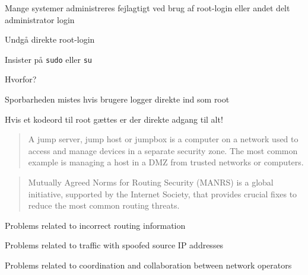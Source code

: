 \documentclass[Screen16to9,17pt]{foils}
\begin{document}
\begin{list1}
\item Mange systemer administreres fejlagtigt ved brug af
  root-login eller andet delt administrator login
\item Undgå direkte root-login
\item Insister på \verb+sudo+ eller \verb+su+
\item Hvorfor?
\begin{list2}
\item Sporbarheden mistes hvis brugere logger direkte ind som root
\item Hvis et kodeord til root gættes er der direkte adgang til alt!
\end{list2}
\end{list1}



\begin{quote}
A jump server, jump host or jumpbox is a computer on a network used to access and manage devices in a separate security zone. The most common example is managing a host in a DMZ from trusted networks or computers.
\end{quote}






\begin{quote}
  Mutually Agreed Norms for Routing Security (MANRS) is a global initiative, supported by the Internet Society, that provides crucial fixes to reduce the most common routing threats. ﻿
\end{quote}

\begin{list1}
\item Problems related to incorrect routing information
\item Problems related to traffic with spoofed source IP addresses
\item Problems related to coordination and collaboration between network operators
\item {\small{}}
\item {\small{}}
\end{list1}
\end{document}

